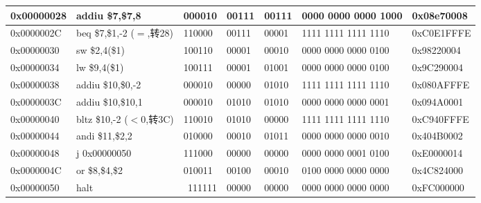 \begin{table}[htbp]
\begin{tabular}{|l|l|r|l|l|l|l|}
    \hline
    0x00000028 & addiu \$7,\$7,8 & \multicolumn{1}{l|}{000010} & 00111 & 00111 & 0000 0000 0000 1000 & 0x08e70008 \bigstrut\\
    \hline
    0x0000002C & beq \$7,\$1,-2 ($=$,转28) & \multicolumn{1}{l|}{110000} & 00111 & 00001 & 1111 1111 1111 1110 & 0xC0E1FFFE \bigstrut\\
    \hline
    0x00000030 & sw  \$2,4(\$1) & \multicolumn{1}{l|}{100110} & 00001 & 00010 & 0000 0000 0000 0100 & 0x98220004 \bigstrut\\
    \hline
    0x00000034 & lw  \$9,4(\$1) & \multicolumn{1}{l|}{100111} & 00001 & 01001 & 0000 0000 0000 0100 & 0x9C290004 \bigstrut\\
    \hline
    0x00000038 & addiu  \$10,\$0,-2 & \multicolumn{1}{l|}{000010} & 00000 & 01010 & 1111 1111 1111 1110 & 0x080AFFFE \bigstrut\\
    \hline
    0x0000003C & addiu  \$10,\$10,1 & \multicolumn{1}{l|}{000010} & 01010 & 01010 & 0000 0000 0000 0001 & 0x094A0001 \bigstrut\\
    \hline
    0x00000040 & bltz \$10,-2 ($<0$,转3C) & \multicolumn{1}{l|}{110010} & 01010 & 00000 & 1111 1111 1111 1110 & 0xC940FFFE \bigstrut\\
    \hline
    0x00000044 & andi  \$11,\$2,2 & \multicolumn{1}{l|}{010000} & 00010 & 01011 & 0000 0000 0000 0010 & 0x404B0002 \bigstrut\\
    \hline
    0x00000048 & j  0x00000050 & \multicolumn{1}{l|}{111000} & 00000 & 00000 & 0000 0000 0001 0100 & 0xE0000014 \bigstrut\\
    \hline
    0x0000004C & or  \$8,\$4,\$2 & \multicolumn{1}{l|}{010011} & 00100 & 00010 & 0100 0000 0000 0000 & 0x4C824000 \bigstrut\\
    \hline
    0x00000050 & halt  & 111111 & 00000 & 00000 & 0000 0000 0000 0000 & 0xFC000000 \bigstrut\\
    \hline
    \end{tabular}%
  \label{tab:test}%
\end{table}%
